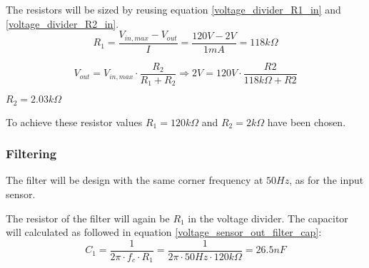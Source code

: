 The resistors will be sized by reusing equation \ref{voltage_divider_R1_in} and \ref{voltage_divider_R2_in}.
\begin{equation}
	R_1 = \frac{V_{in,max}-V_{out}}{I} = \frac{120V-2V}{1mA} = 118k\Omega	
\end{equation}

\begin{equation} 
V_{out} = V_{in,max} \cdot \frac{R_2}{R_1+R_2} \Rightarrow 2V = 120V \cdot \frac{R2}{118k\Omega+R2}
\end{equation}
\begin{center}
	$R_2 = 2.03k\Omega$
\end{center}

To achieve these resistor values $R_1 = 120k\Omega$ and $R_2 = 2k\Omega$ have been chosen. 

\subsubsection{Filtering}
The filter will be design with the same corner frequency at $50Hz$, as for the input sensor.

The resistor of the filter will again be $R_1$ in the voltage divider. The capacitor will calculated as followed in equation \ref{voltage_sensor_out_filter_cap}:
\begin{equation} \label{voltage_sensor_out_filter_cap}
C_1 = \frac{1}{2\pi \cdot f_c \cdot R_1} = \frac{1}{2 \pi \cdot 50Hz \cdot 120k\Omega} = 26.5nF
\end{equation}